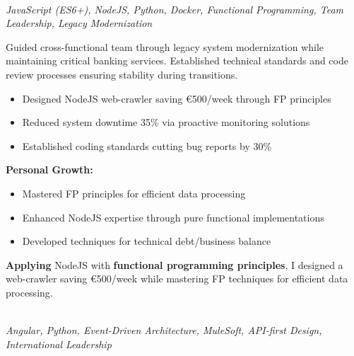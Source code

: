 \documentclass[a4paper,10pt]{article}
\newcommand{\experiencebreak}{\needspace{18\baselineskip}}
\begin{document}
\experiencebreak
\noindent\uline{} \\
\vspace{0.1cm} \hspace{0.2cm}
{\small\textit{JavaScript (ES6+), NodeJS, Python, Docker, Functional Programming, Team Leadership, Legacy Modernization}}

Guided cross-functional team through legacy system modernization while maintaining critical banking services. Established technical standards and code review processes ensuring stability during transitions.

\vspace{0.2cm}
\begin{itemize}[label=\textcolor{darkblue}{\textbullet}, leftmargin=*, nosep]
	\item Designed NodeJS web-crawler saving €500/week through FP principles
	\item Reduced system downtime 35\% via proactive monitoring solutions
	\item Established coding standards cutting bug reports by 30\%
\end{itemize}

\vspace{0.2cm}
\textbf{Personal Growth:}
\vspace{0.2cm}
\begin{itemize}[label=\textcolor{darkblue}{\textbullet}, leftmargin=*, nosep]
	\item Mastered FP principles for efficient data processing
	\item Enhanced NodeJS expertise through pure functional implementations
	\item Developed techniques for technical debt/business balance
\end{itemize}

\vspace{0.4cm}

\textbf{Applying} NodeJS with \textbf{functional programming principles}, I designed a web-crawler saving €500/week while mastering FP techniques for efficient data processing.

\vspace{0.4cm}

\experiencebreak
\noindent\uline{} \\
\vspace{0.1cm} \hspace{0.2cm}
{\small\textit{Angular, Python, Event-Driven Architecture, MuleSoft, API-first Design, International Leadership}}
\end{document}
